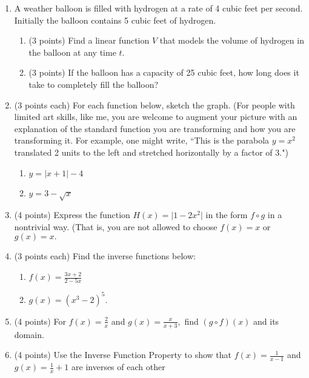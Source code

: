 \documentclass[11pt]{article}
\begin{document}
\begin{enumerate}
\item A weather balloon is filled with hydrogen at a rate of 4 cubic feet per second. Initially the balloon contains 5 cubic feet of hydrogen.
\begin{enumerate}
\item (3 points) Find a linear function $V$ that models the volume of hydrogen in the balloon at any time $t.$
\vspace{1in}
\item (3 points) If the balloon has a capacity of 25 cubic feet, how long does it take to completely fill the balloon?
\vspace{1in}
\end{enumerate}
\item (3 points each) For each function below, sketch the graph. (For people with limited art skills, like me, you are welcome to augment your picture with an explanation of the standard function you are transforming and how you are transforming it. For example, one might write, ``This is the parabola $y=x^2$ translated 2 units to the left and stretched horizontally by a factor of 3.")
\begin{enumerate}
\item $y=|x+1|-4$
\vfill
\item $y=3-\sqrt{x}$
\vfill
\end{enumerate}
\item (4 points) Express the function $H(x)=\vert 1-2x^2 \vert$ in the form $f \circ g$ in a nontrivial way. (That is, you are not allowed to choose $f(x)=x$ or $g(x)=x.$
\vspace{.75in}
\newpage
\item (3 points each) Find the inverse functions below: 
\begin{enumerate}
\item $f(x)=\frac{3x+2}{2-5x}$
\vfill
\item $g(x)=(x^3-2)^5.$
\vfill
\end{enumerate}

\item (4 points) For $f(x)=\frac{2}{x}$ and $g(x)=\frac{x}{x+3},$ find $(g \circ f)(x)$ and its domain.
\vfill
\item (4 points) Use the Inverse Function Property to show that $f(x)=\frac{1}{x-1}$ and $g(x)=\frac{1}{x}+1$ are inverses of each other
\vfill
\end{enumerate}
\end{document}
